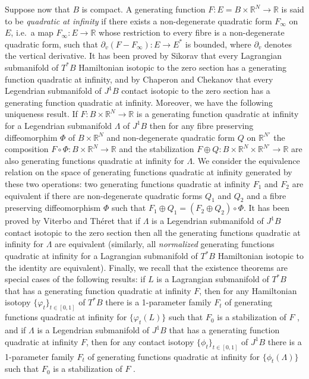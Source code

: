 \documentclass{amsart}
\theoremstyle{remark}
\begin{document}
Suppose now that $B$ is compact.
A generating function
$F: E = B \times \mathbb{R}^N \rightarrow \mathbb{R}$
is said to be \emph{quadratic at infinity}
if there exists a non-degenerate quadratic form $F_{\infty}$ on $E$,
i.e.\ a map $F_{\infty}: E \rightarrow \mathbb{R}$
whose restriction to every fibre
is a non-degenerate quadratic form,
such that
$\partial_v (F - F_{\infty}): E \rightarrow E^{\ast}$
is bounded,
where $\partial_v$ denotes the vertical derivative.
It has been proved by Sikorav \cite{Sikorav87}
that every Lagrangian submanifold of $T^{\ast}B$
Hamiltonian isotopic to the zero section
has a generating function quadratic at infinity,
and by Chaperon \cite{Chaperon}
and Chekanov \cite{Chekanov}
that every Legendrian submanifold of $J^1B$
contact isotopic to the zero section
has a generating function quadratic at infinity.
Moreover, we have the following uniqueness result.
If $F: B \times \mathbb{R}^N \rightarrow \mathbb{R}$
is a generating function quadratic at infinity
for a Legendrian submanifold $\Lambda$ of $J^1B$
then for any fibre preserving diffeomorphim $\Phi$ of $B \times \mathbb{R}^N$
and non-degenerate quadratic form $Q$ on $\mathbb{R}^{N'}$
the composition $F \circ \Phi: B \times \mathbb{R}^N \rightarrow \mathbb{R}$
and the stabilization
$F \oplus Q: B \times \mathbb{R}^N \times \mathbb{R}^{N'} \rightarrow \mathbb{R}$
are also generating functions quadratic at infinity for $\Lambda$.
We consider the equivalence relation
on the space of generating functions quadratic at infinity
generated by these two operations:
two generating functions quadratic at infinity $F_1$ and $F_2$
are equivalent if there are non-degenerate quadratic forms $Q_1$ and $Q_2$
and a fibre preserving diffeomorphism $\Phi$
such that $F_1 \oplus Q_1 = (F_2 \oplus Q_2) \circ \Phi$.
It has been proved by Viterbo and Th\'eret
\cite{Viterbo, Theret, Theret_thesis}
that if $\Lambda$ is a Legendrian submanifold of $J^1B$
contact isotopic to the zero section
then all the generating functions quadratic at infinity for $\Lambda$
are equivalent
(similarly,
all \emph{normalized} generating functions quadratic at infinity
for a Lagrangian submanifold of $T^{\ast}B$
Hamiltonian isotopic to the identity
are equivalent).
Finally,
we recall that the existence theorems
are special cases of the following results:
if $L$ is a Lagrangian submanifold of $T^{\ast}B$
that has a generating function quadratic at infinity $F$,
then for any Hamiltonian isotopy $\{\varphi_t\}_{t \in [0, 1]}$
of $T^{\ast}B$
there is a 1-parameter family $F_t$
of generating functions quadratic at infinity
for $\{\varphi_t (L)\}$
such that $F_0$ is a stabilization of $F$ \cite{Sikorav87},
and if $\Lambda$ is a Legendrian submanifold of $J^1B$
that has a generating function quadratic at infinity $F$,
then for any contact isotopy $\{\phi_t\}_{t \in [0, 1]}$ of $J^1B$
there is a 1-parameter family $F_t$
of generating functions quadratic at infinity
for $\{\phi_t (\Lambda)\}$
such that $F_0$ is a stabilization of $F$
\cite{Chaperon, Chekanov}.
\end{document}
